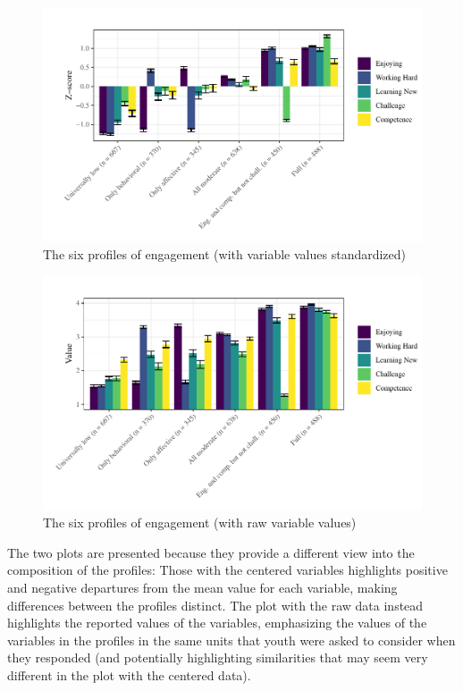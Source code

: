\documentclass[]{book}
\theoremstyle{definition}
\theoremstyle{definition}
\theoremstyle{definition}
\theoremstyle{remark}
\begin{document}
\begin{figure}

{\centering \includegraphics[width=1\linewidth]{rosenberg-dissertation_files/figure-latex/unnamed-chunk-11-1} 

}

\caption{The six profiles of engagement (with variable values standardized)}\label{fig:unnamed-chunk-11}
\end{figure}

\begin{figure}

{\centering \includegraphics[width=1\linewidth]{rosenberg-dissertation_files/figure-latex/unnamed-chunk-12-1} 

}

\caption{The six profiles of engagement (with raw variable values)}\label{fig:unnamed-chunk-12}
\end{figure}

The two plots are presented because they provide a different view into
the composition of the profiles: Those with the centered variables
highlights positive and negative departures from the mean value for each
variable, making differences between the profiles distinct. The plot
with the raw data instead highlights the reported values of the
variables, emphasizing the values of the variables in the profiles in
the same units that youth were asked to consider when they responded
(and potentially highlighting similarities that may seem very different
in the plot with the centered data).
\end{document}
